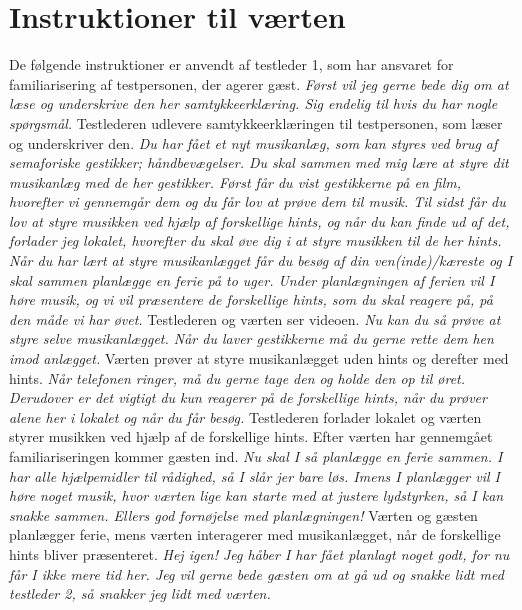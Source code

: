 \chapter{Instruktioner til værten}
\label{app:InstruktionerVaert}
%
De følgende instruktioner er anvendt af testleder 1, som har ansvaret for familiarisering af testpersonen, der agerer gæst. \blankline
%
\textit{Først vil jeg gerne bede dig om at læse og underskrive den her samtykkeerklæring. Sig endelig til hvis du har nogle spørgsmål.}\blankline
%
Testlederen udlevere samtykkeerklæringen til testpersonen, som læser og underskriver den. \blankline
%
\textit{Du har fået et nyt musikanlæg, som kan styres ved brug af semaforiske gestikker; håndbevægelser. Du skal sammen med mig lære at styre dit musikanlæg med de her gestikker. Først får du vist gestikkerne på en film, hvorefter vi gennemgår dem og du får lov at prøve dem til musik. Til sidst får du lov at styre musikken ved hjælp af forskellige hints, og når du kan finde ud af det, forlader jeg lokalet, hvorefter du skal øve dig i at styre musikken til de her hints. Når du har lært at styre musikanlægget får du besøg af din ven(inde)/kæreste og I skal sammen planlægge en ferie på to uger. Under planlægningen af ferien vil I høre musik, og vi vil præsentere de forskellige hints, som du skal reagere på, på den måde vi har øvet.}\blankline
%
Testlederen og værten ser videoen.\blankline
%
\textit{Nu kan du så prøve at styre selve musikanlægget. Når du laver gestikkerne må du gerne rette dem hen imod anlægget.}\blankline
%
Værten prøver at styre musikanlægget uden hints og derefter med hints. \blankline
%
\textit{Når telefonen ringer, må du gerne tage den og holde den op til øret. Derudover er det vigtigt du kun reagerer på de forskellige hints, når du prøver alene her i lokalet og når du får besøg.}\blankline
%
Testlederen forlader lokalet og værten styrer musikken ved hjælp af de forskellige hints. Efter værten har gennemgået familiariseringen kommer gæsten ind. \blankline
%
\textit{Nu skal I så planlægge en ferie sammen. I har alle hjælpemidler til rådighed, så I slår jer bare løs. Imens I planlægger vil I høre noget musik, hvor værten lige kan starte med at justere lydstyrken, så I kan snakke sammen. Ellers god fornøjelse med planlægningen!}\blankline
%
Værten og gæsten planlægger ferie, mens værten interagerer med musikanlægget, når de forskellige hints bliver præsenteret.\blankline
%
\textit{Hej igen! Jeg håber I har fået planlagt noget godt, for nu får I ikke mere tid her. Jeg vil gerne bede gæsten om at gå ud og snakke lidt med testleder 2, så snakker jeg lidt med værten.}

